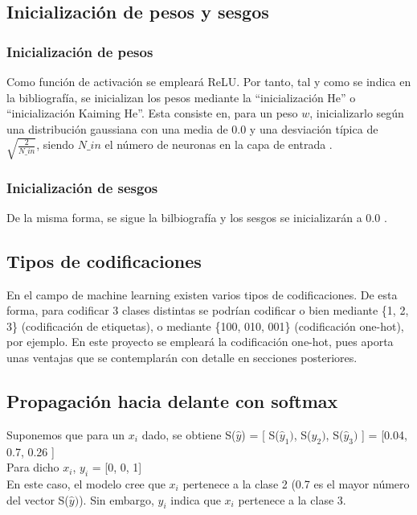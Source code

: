 \subsection{Inicialización de pesos y sesgos}

\subsubsection{Inicialización de pesos}
Como función de activación se empleará ReLU. Por tanto, tal y como se indica en la bibliografía, se inicializan los pesos mediante la ``inicialización He'' o ``inicialización Kaiming He''. Esta consiste en, para un peso $w$, inicializarlo según una distribución gaussiana con una media de 0.0 y una desviación típica de $\sqrt{\frac{2}{N\_in}}$, siendo $N\_in$ el número de neuronas en la capa de entrada
 \cite{ini_He} \cite{ini_He_2} \cite{ini_He_code}.

\subsubsection{Inicialización de sesgos}

De la misma forma, se sigue la bilbiografía y los sesgos se inicializarán a 0.0 \cite{ini_bias} \cite{ini_bias_2}.

\subsection{Tipos de codificaciones}

En el campo de machine learning existen varios tipos de codificaciones. De esta forma, para codificar 3 clases distintas se podrían codificar o bien mediante \{1, 2, 3\} (codificación de etiquetas), o mediante \{100, 010, 001\} (codificación one-hot), por ejemplo. En este proyecto se empleará la codificación one-hot, pues aporta unas ventajas que se contemplarán con detalle en secciones posteriores.

\subsection{Propagación hacia delante con softmax}

Suponemos que para un $x_i$ dado, se obtiene S($\hat{y}$) = [ S($\hat{y}_1)$, S($\hat{y}_2)$, S($\hat{y}_3)$ ] = [0.04, 0.7, 0.26 ] \\
Para dicho $x_i$, $y_i$ = [0, 0, 1] \\
En este caso, el modelo cree que $x_i$ pertenece a la clase 2 (0.7 es el mayor número del vector S($\hat{y})$). Sin embargo, $y_i$ indica que $x_i$ pertenece a la clase 3. \\

